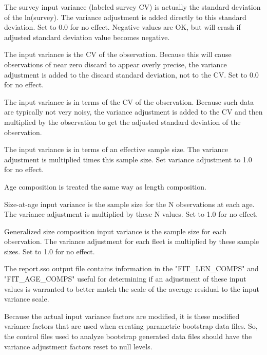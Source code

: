 The survey input variance (labeled survey CV) is actually the standard deviation of the ln(survey). The variance adjustment is added directly to this standard deviation. Set to 0.0 for no effect. Negative values are OK, but will crash if adjusted standard deviation value becomes negative.

The input variance is the CV of the observation. Because this will cause observations of near zero discard to appear overly precise, the variance adjustment is added to the discard standard deviation, not to the CV. Set to 0.0 for no effect.

The input variance is in terms of the CV of the observation. Because such data are typically not very noisy, the variance adjustment is added to the CV and then multiplied by the observation to get the adjusted standard deviation of the observation.

The input variance is in terms of an effective sample size. The variance adjustment is multiplied times this sample size.  Set variance adjustment to 1.0 for no effect.

Age composition is treated the same way as length composition.
	
Size-at-age input variance is the sample size for the N observations at each age.  The variance adjustment is multiplied by these N values. Set to 1.0 for no effect.
	
Generalized size composition input variance is the sample size for each observation. The variance adjustment for each fleet is multiplied by these sample sizes. Set to 1.0 for no effect.
		
The report.sso output file contains information in the "FIT\_LEN\_COMPS" and "FIT\_AGE\_COMPS"  useful for determining if an adjustment of these input values is warranted to better match the scale of the average residual to the input variance scale.
	
Because the actual input variance factors are modified, it is these modified variance factors that are used when creating parametric bootstrap data files. So, the control files used to analyze bootstrap generated data files should have the variance adjustment factors reset to null levels.


